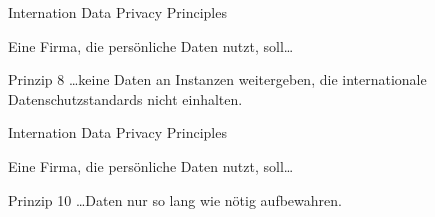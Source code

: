 \begin{frame}{Internation Data Privacy Principles}

    Eine Firma, die persönliche Daten nutzt, soll\dots

    \begin{block}{Prinzip 8 \cite{zankl_international_2014}}
        \dots keine Daten an Instanzen weitergeben, die internationale Datenschutzstandards nicht einhalten. 
    \end{block}


\end{frame}

\begin{frame}{Internation Data Privacy Principles}

    Eine Firma, die persönliche Daten nutzt, soll\dots

    \begin{block}{Prinzip 10 \cite{zankl_international_2014}}
        \dots Daten nur so lang wie nötig aufbewahren.
    \end{block}


\end{frame}
